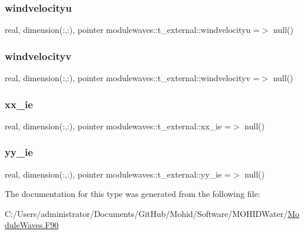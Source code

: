 \subsubsection{\texorpdfstring{windvelocityu}{windvelocityu}}
{\footnotesize\ttfamily real, dimension(\+:,\+:), pointer modulewaves\+::t\+\_\+external\+::windvelocityu =$>$ null()\hspace{0.3cm}{\ttfamily [private]}}

\mbox{\label{structmodulewaves_1_1t__external_acf2611a1417aa702b38dc6164479e6f7}} 
\subsubsection{\texorpdfstring{windvelocityv}{windvelocityv}}
{\footnotesize\ttfamily real, dimension(\+:,\+:), pointer modulewaves\+::t\+\_\+external\+::windvelocityv =$>$ null()\hspace{0.3cm}{\ttfamily [private]}}

\mbox{\label{structmodulewaves_1_1t__external_ab2906c8d9d07cfe6724fce3bc7b3cdab}} 
\subsubsection{\texorpdfstring{xx\+\_\+ie}{xx\_ie}}
{\footnotesize\ttfamily real, dimension(\+:,\+:), pointer modulewaves\+::t\+\_\+external\+::xx\+\_\+ie =$>$ null()\hspace{0.3cm}{\ttfamily [private]}}

\mbox{\label{structmodulewaves_1_1t__external_aeb3f9b379d4f0a2e0db96c8a1f8d540d}} 
\subsubsection{\texorpdfstring{yy\+\_\+ie}{yy\_ie}}
{\footnotesize\ttfamily real, dimension(\+:,\+:), pointer modulewaves\+::t\+\_\+external\+::yy\+\_\+ie =$>$ null()\hspace{0.3cm}{\ttfamily [private]}}



The documentation for this type was generated from the following file\+:\begin{DoxyCompactItemize}
\item 
C\+:/\+Users/administrator/\+Documents/\+Git\+Hub/\+Mohid/\+Software/\+M\+O\+H\+I\+D\+Water/\mbox{\hyperlink{_module_waves_8_f90}{Module\+Waves.\+F90}}\end{DoxyCompactItemize}

